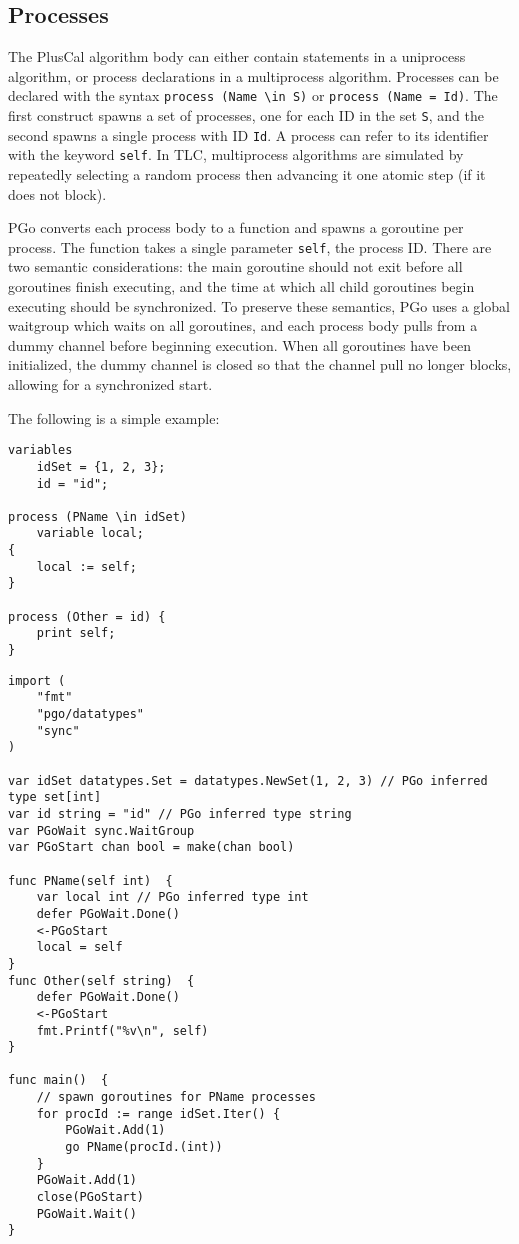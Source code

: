 \subsection{Processes}
The PlusCal algorithm body can either contain statements in a uniprocess algorithm, or process declarations in a multiprocess algorithm. Processes can be declared with the syntax \verb|process (Name \in S)| or \verb|process (Name = Id)|. The first construct spawns a set of processes, one for each ID in the set \texttt{S}, and the second spawns a single process with ID \texttt{Id}. A process can refer to its identifier with the keyword \texttt{self}. In TLC, multiprocess algorithms are simulated by repeatedly selecting a random process then advancing it one atomic step (if it does not block).

PGo converts each process body to a function and spawns a goroutine per process. The function takes a single parameter \texttt{self}, the process ID. There are two semantic considerations: the main goroutine should not exit before all goroutines finish executing, and the time at which all child goroutines begin executing should be synchronized. To preserve these semantics, PGo uses a global waitgroup which waits on all goroutines, and each process body pulls from a dummy channel before beginning execution. When all goroutines have been initialized, the dummy channel is closed so that the channel pull no longer blocks, allowing for a synchronized start.

The following is a simple example:

\noindent
\begin{minipage}[t]{\textwidth}
\begin{lstlisting}[language=pcal]
variables
	idSet = {1, 2, 3};
	id = "id";
	
process (PName \in idSet)
	variable local;
{
	local := self;
}

process (Other = id) {
	print self;
}
\end{lstlisting}
\end{minipage}

\noindent
\begin{minipage}[t]{\textwidth}
\begin{lstlisting}[language=golang]
import (
	"fmt"
	"pgo/datatypes"
	"sync"
)

var idSet datatypes.Set = datatypes.NewSet(1, 2, 3) // PGo inferred type set[int]
var id string = "id" // PGo inferred type string
var PGoWait sync.WaitGroup
var PGoStart chan bool = make(chan bool)

func PName(self int)  {
	var local int // PGo inferred type int
	defer PGoWait.Done()
	<-PGoStart
	local = self
}
func Other(self string)  {
	defer PGoWait.Done()
	<-PGoStart
	fmt.Printf("%v\n", self)
}

func main()  {
	// spawn goroutines for PName processes
	for procId := range idSet.Iter() {
		PGoWait.Add(1)
		go PName(procId.(int))
	}
	PGoWait.Add(1)
	close(PGoStart)
	PGoWait.Wait()
}
\end{lstlisting}
\end{minipage}

